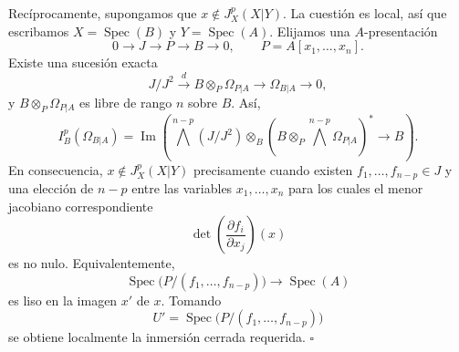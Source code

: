 
Recíprocamente, supongamos que $x\notin J_X^p(X|Y)$. La cuestión es
local, así que escribamos $X=\operatorname{Spec}(B)$ y
$Y=\operatorname{Spec}(A)$. Elijamos una $A$-presentación
\[
0\longrightarrow J\longrightarrow P\longrightarrow B
\longrightarrow0,
\qquad P=A[x_1,\ldots,x_n].
\]
Existe una sucesión exacta
\[
J/J^2\xrightarrow{d}B\otimes_P\Omega_{P|A}
\longrightarrow\Omega_{B|A}\longrightarrow0,
\]
y $B\otimes_P\Omega_{P|A}$ es libre de rango $n$ sobre $B$. Así,
\[
I_B^p(\Omega_{B|A})
=\operatorname{Im}\left(
 \bigwedge^{n-p}(J/J^2)\otimes_B
 (B\otimes_P\bigwedge^{n-p}\Omega_{P|A})^*
 \longrightarrow B\right).
\]
En consecuencia, $x\notin J_X^p(X|Y)$ precisamente cuando existen
$f_1,\ldots,f_{n-p}\in J$ y una elección de $n-p$ entre las variables
$x_1,\ldots,x_n$ para los cuales el menor jacobiano correspondiente
\[
\det\left(\frac{\partial f_i}{\partial x_j}\right)(x)
\]
es no nulo. Equivalentemente,
\[
\operatorname{Spec}\bigl(P/(f_1,\ldots,f_{n-p})\bigr)
\longrightarrow\operatorname{Spec}(A)
\]
es liso en la imagen $x'$ de $x$. Tomando
\[
U'=\operatorname{Spec}\bigl(P/(f_1,\ldots,f_{n-p})\bigr)
\]
se obtiene localmente la inmersión cerrada requerida. \hfill$\square$
